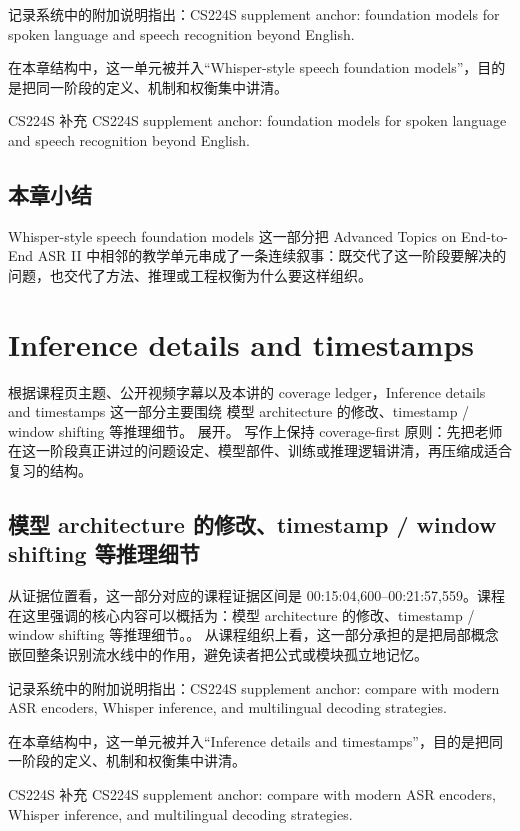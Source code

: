 \documentclass[a4paper]{article}
\begin{document}
记录系统中的附加说明指出：CS224S supplement anchor: foundation models for spoken language and speech recognition beyond English.

在本章结构中，这一单元被并入“Whisper-style speech foundation models”，目的是把同一阶段的定义、机制和权衡集中讲清。
\begin{knowledgebox}{CS224S 补充}
CS224S supplement anchor: foundation models for spoken language and speech recognition beyond English.
\end{knowledgebox}

\subsection{本章小结}
Whisper-style speech foundation models 这一部分把 Advanced Topics on End-to-End ASR II 中相邻的教学单元串成了一条连续叙事：既交代了这一阶段要解决的问题，也交代了方法、推理或工程权衡为什么要这样组织。

\section{Inference details and timestamps}
根据课程页主题、公开视频字幕以及本讲的 coverage ledger，Inference details and timestamps 这一部分主要围绕 模型 architecture 的修改、timestamp / window shifting 等推理细节。 展开。
写作上保持 coverage-first 原则：先把老师在这一阶段真正讲过的问题设定、模型部件、训练或推理逻辑讲清，再压缩成适合复习的结构。

\subsection{模型 architecture 的修改、timestamp / window shifting 等推理细节}
从证据位置看，这一部分对应的课程证据区间是 00:15:04,600--00:21:57,559。课程在这里强调的核心内容可以概括为：模型 architecture 的修改、timestamp / window shifting 等推理细节。。
从课程组织上看，这一部分承担的是把局部概念嵌回整条识别流水线中的作用，避免读者把公式或模块孤立地记忆。

记录系统中的附加说明指出：CS224S supplement anchor: compare with modern ASR encoders, Whisper inference, and multilingual decoding strategies.

在本章结构中，这一单元被并入“Inference details and timestamps”，目的是把同一阶段的定义、机制和权衡集中讲清。
\begin{knowledgebox}{CS224S 补充}
CS224S supplement anchor: compare with modern ASR encoders, Whisper inference, and multilingual decoding strategies.
\end{knowledgebox}
\end{document}
